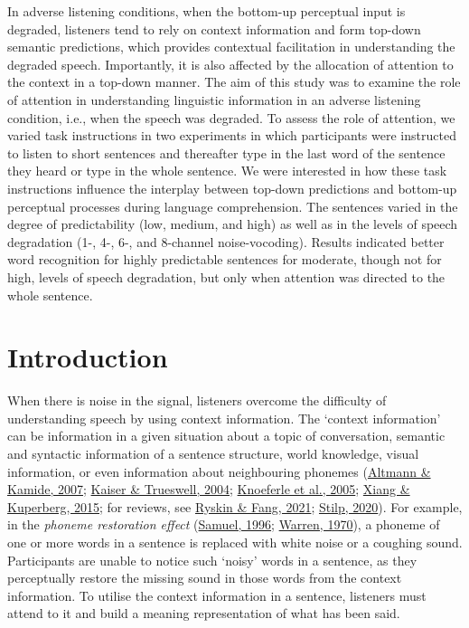 \documentclass[a4paper, nobind]{templates/ociamthesis}
\begin{document}
In adverse listening conditions, when the bottom-up perceptual input is degraded, listeners tend to rely on context information and form top-down semantic predictions,
which provides contextual facilitation in understanding the degraded speech.
Importantly, it is also affected by the allocation of attention to the context in a top-down manner.
The aim of this study was to examine the role of attention in understanding linguistic information in an adverse listening condition, i.e., when the speech was degraded.
To assess the role of attention, we varied task instructions in two experiments in which participants were instructed to listen to short sentences and thereafter type in the last word of the sentence they heard or type in the whole sentence.
We were interested in how these task instructions influence the interplay between top-down predictions and bottom-up perceptual processes during language comprehension.
The sentences varied in the degree of predictability (low, medium, and high) as well as in the levels of speech degradation (1-, 4-, 6-, and 8-channel noise-vocoding).
Results indicated better word recognition for highly predictable sentences for moderate, though not for high, levels of speech degradation, but only when attention was directed to the whole sentence.

\hypertarget{introduction}{%
\section{Introduction}\label{introduction}}

When there is noise in the signal,
listeners overcome the difficulty of understanding speech by using context information.
The `context information' can be information in a given situation about a topic of conversation, semantic and syntactic information of a sentence structure, world knowledge, visual information, or even information about neighbouring phonemes (\protect\hyperlink{ref-Altmann2007}{Altmann \& Kamide, 2007}; \protect\hyperlink{ref-Kaiser2004}{Kaiser \& Trueswell, 2004}; \protect\hyperlink{ref-Knoeferle2005}{Knoeferle et al., 2005}; \protect\hyperlink{ref-Xiang2015}{Xiang \& Kuperberg, 2015}; for reviews, see \protect\hyperlink{ref-Ryskin2021}{Ryskin \& Fang, 2021}; \protect\hyperlink{ref-Stilp2020}{Stilp, 2020}).
For example, in the \emph{phoneme restoration effect} (\protect\hyperlink{ref-Samuel1996}{Samuel, 1996}; \protect\hyperlink{ref-Warren1970}{Warren, 1970}), a phoneme of one or more words in a sentence is replaced with white noise or a coughing sound.
Participants are unable to notice such `noisy' words in a sentence, as they perceptually restore the missing sound in those words from the context information.
To utilise the context information in a sentence, listeners must attend to it and build a meaning representation of what has been said.
\end{document}
